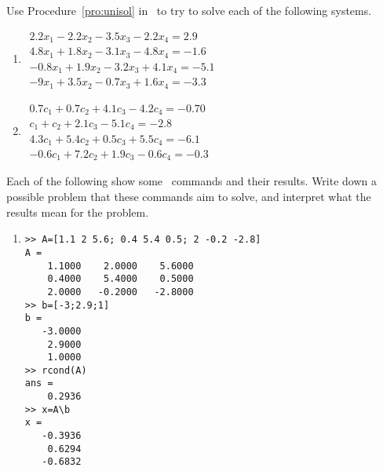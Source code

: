 \begin{exercise} \label{ex:} 
Use Procedure~\ref{pro:unisol} in \script\ to try to solve each of the following systems.
\begin{enumerate}
\item \(\begin{array}{l}
2.2x_1  -2.2x_2  -3.5x_3  -2.2x_4=   2.9\\
   4.8x_1+   1.8x_2  -3.1x_3  -4.8x_4=  -1.6\\
  -0.8x_1+   1.9x_2  -3.2x_3+   4.1x_4=  -5.1\\
  -9x_1+   3.5x_2  -0.7x_3+   1.6x_4=  -3.3\end{array}\)

\item \(\begin{array}{l}
   0.7c_1+   0.7c_2+   4.1c_3  -4.2c_4=  -0.70\\
   c_1+  c_2+  2.1c_3 -5.1c_4= -2.8\\
   4.3c_1+  5.4c_2+  0.5c_3+  5.5c_4= -6.1\\
  -0.6c_1+  7.2c_2+  1.9c_3 -0.6c_4= -0.3\end{array}\)

%
\end{enumerate}
\end{exercise}





\begin{exercise} \label{ex:} 
Each of the following show some \script\ commands and their results.
Write down a possible problem that these commands aim to solve, and interpret what the results mean for the problem.
\begin{enumerate}
\item 
\begin{verbatim}
>> A=[1.1 2 5.6; 0.4 5.4 0.5; 2 -0.2 -2.8]
A =
    1.1000    2.0000    5.6000
    0.4000    5.4000    0.5000
    2.0000   -0.2000   -2.8000
>> b=[-3;2.9;1]
b =
   -3.0000
    2.9000
    1.0000
>> rcond(A)
ans =
    0.2936
>> x=A\b
x =
   -0.3936
    0.6294
   -0.6832
\end{verbatim}

\begin{comment}
Need more like this, and some displaying bad rcond, and some displaying errors.
\end{comment}

\end{enumerate}
\end{exercise}







